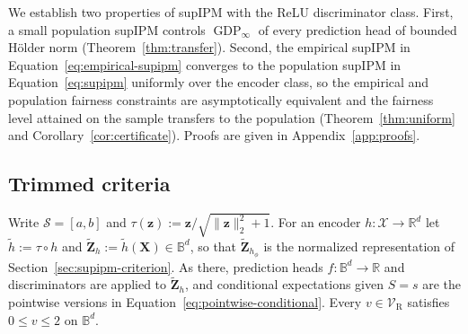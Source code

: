 %
%     
%     
%
\label{sec:theory}

We establish two properties of supIPM with the ReLU discriminator class.  First, a small population supIPM controls $\operatorname{GDP}_{\infty}$ of every prediction head of bounded H\"older norm (Theorem~\ref{thm:transfer}).  Second, the empirical supIPM in Equation~\ref{eq:empirical-supipm} converges to the population supIPM in Equation~\ref{eq:supipm} uniformly over the encoder class, so the empirical and population fairness constraints are asymptotically equivalent and the fairness level attained on the sample transfers to the population (Theorem~\ref{thm:uniform} and Corollary~\ref{cor:certificate}).  Proofs are given in Appendix~\ref{app:proofs}.

\subsection{Trimmed criteria}
\label{sec:theory-setup}

Write $\mathcal{S}=[a,b]$ and $\tau(\mathbf{z}):=\mathbf{z}/\sqrt{\lVert\mathbf{z}\rVert_2^2+1}$.  For an encoder $h:\mathcal{X}\to\mathbb{R}^d$ let $\widetilde{h}:=\tau\circ h$ and $\widetilde{\mathbf{Z}}_h:=\widetilde{h}(\mathbf{X})\in\mathbb{B}^d$, so that $\widetilde{\mathbf{Z}}_{h_\phi}$ is the normalized representation of Section~\ref{sec:supipm-criterion}.  As there, prediction heads $f:\mathbb{B}^d\to\mathbb{R}$ and discriminators are applied to $\widetilde{\mathbf{Z}}_h$, and conditional expectations given $S=s$ are the pointwise versions in Equation~\ref{eq:pointwise-conditional}.  Every $v\in\mathcal{V}_{\mathrm{R}}$ satisfies $0\le v\le2$ on $\mathbb{B}^d$.

